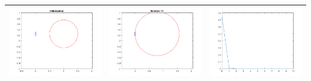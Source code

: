 \documentclass[12pt]{article}
\begin{document}
\begin{enumerate}
\begin{center}
\begin{tabular}{|c|c|c|}
				\includegraphics[scale = 0.3]{x0_2_start.png}
				&
				\includegraphics[scale = 0.3]{x0_2_end.png}
				&
				\includegraphics[scale = 0.3]{x0_2_error.png} \\

			\hline
		\end{tabular}
	\end{center}
\end{enumerate}
\end{document}
